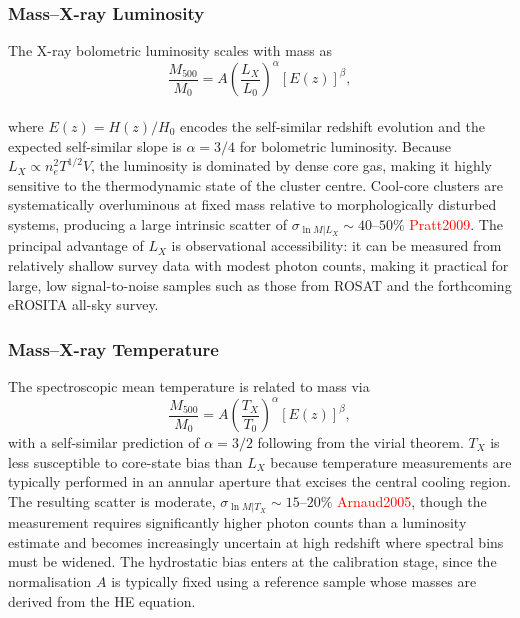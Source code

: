 \subsubsection{Mass--X-ray Luminosity}
The X-ray bolometric luminosity scales with mass as
\begin{equation}
	\frac{M_{500}}{M_0} = A \left( \frac{L_X}{L_0} \right)^{\alpha} [E(z)]^{\beta},
	\label{eq:Lx_mass}
\end{equation}
\\
where $E(z) = H(z)/H_0$ encodes the self-similar redshift evolution and the expected self-similar slope is $\alpha = 3/4$ for bolometric luminosity. Because $L_X \propto n_e^2 T^{1/2} V$, the luminosity is dominated by dense core gas, making it highly sensitive to the thermodynamic state of the cluster centre. Cool-core clusters are systematically overluminous at fixed mass relative to morphologically disturbed systems, producing a large intrinsic scatter of $\sigma_{\ln M | L_X} \sim 40$--$50\%$ \textcolor{red}{Pratt2009}. The principal advantage of $L_X$ is observational accessibility: it can be measured from relatively shallow survey data with modest photon counts, making it practical for large, low signal-to-noise samples such as those from ROSAT and the forthcoming eROSITA all-sky survey.

\subsubsection{Mass--X-ray Temperature}
The spectroscopic mean temperature is related to mass via
\begin{equation}
	\frac{M_{500}}{M_0} = A \left( \frac{T_X}{T_0} \right)^{\alpha} [E(z)]^{\beta},
	\label{eq:Tx_mass}
\end{equation}
with a self-similar prediction of $\alpha = 3/2$ following from the virial theorem. $T_X$ is less susceptible to core-state bias than $L_X$ because temperature measurements are typically performed in an annular aperture that excises the central cooling region. The resulting scatter is moderate, $\sigma_{\ln M | T_X} \sim 15$--$20\%$ \textcolor{red}{Arnaud2005}, though the measurement requires significantly higher photon counts than a luminosity estimate and becomes increasingly uncertain at high redshift where spectral bins must be widened. The hydrostatic bias enters at the calibration stage, since the normalisation $A$ is typically fixed using a reference sample whose masses are derived from the HE equation.

